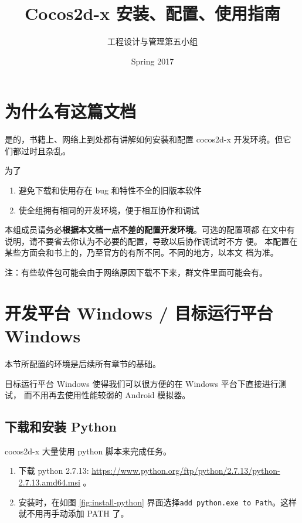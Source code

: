 \documentclass[a4paper, 10pt]{article}
\begin{document}
\title{Cocos2d-x 安装、配置、使用指南}
\author{工程设计与管理第五小组}
\date{Spring 2017}

\maketitle
{}
\tableofcontents
\listoftables
\listoffigures

\section{为什么有这篇文档}

是的，书籍上、网络上到处都有讲解如何安装和配置 cocos2d-x 开发环境。但它
们都过时且杂乱。

为了

\begin{enumerate}
\item 避免下载和使用存在 bug 和特性不全的旧版本软件
\item 使全组拥有相同的开发环境，便于相互协作和调试
\end{enumerate}

本组成员请务必\textbf{根据本文档一点不差的配置开发环境}。可选的配置项都
在文中有说明，请不要省去你认为不必要的配置，导致以后协作调试时不方
便。 本配置在某些方面会和书上的，乃至官方的有所不同。不同的地方，以本文
档为准。

注：有些软件包可能会由于网络原因下载不下来，群文件里面可能会有。

\section{开发平台 Windows / 目标运行平台 Windows}

本节所配置的环境是后续所有章节的基础。

目标运行平台 Windows 使得我们可以很方便的在 Windows 平台下直接进行测试，
而不用再去使用性能较弱的 Android 模拟器。

\subsection{下载和安装 Python}

cocos2d-x 大量使用 python 脚本来完成任务。

\begin{enumerate}
\item 下载 python 2.7.13:
  \url{https://www.python.org/ftp/python/2.7.13/python-2.7.13.amd64.msi}
  。

\item 安装时，在如图 \ref{fig:install-python} 界面选择\texttt{add python.exe
  to Path}。这样就不用再手动添加 PATH 了。
\end{enumerate}
\end{document}
